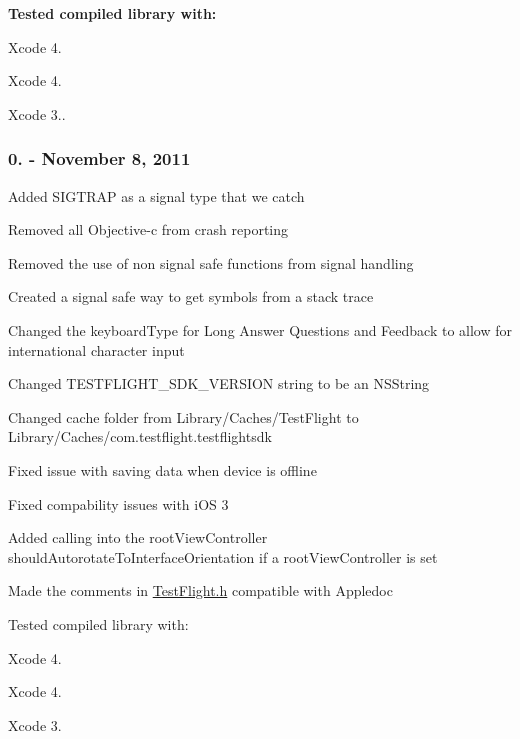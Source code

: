 {\bfseries Tested compiled library with\-:}


\begin{DoxyItemize}
\item Xcode 4.
\item Xcode 4.
\item Xcode 3..
\end{DoxyItemize}

\subsubsection*{0. -\/ November 8, 2011}


\begin{DoxyItemize}
\item Added {\ttfamily S\-I\-G\-T\-R\-A\-P} as a signal type that we catch
\item Removed all Objective-\/c from crash reporting
\item Removed the use of non signal safe functions from signal handling
\item Created a signal safe way to get symbols from a stack trace
\item Changed the keyboard\-Type for Long Answer Questions and Feedback to allow for international character input
\item Changed {\ttfamily T\-E\-S\-T\-F\-L\-I\-G\-H\-T\-\_\-\-S\-D\-K\-\_\-\-V\-E\-R\-S\-I\-O\-N} string to be an {\ttfamily N\-S\-String}
\item Changed cache folder from Library/\-Caches/\-Test\-Flight to Library/\-Caches/com.\-testflight.\-testflightsdk
\item Fixed issue with saving data when device is offline
\item Fixed compability issues with i\-O\-S 3
\item Added calling into the root\-View\-Controller should\-Autorotate\-To\-Interface\-Orientation if a root\-View\-Controller is set
\item Made the comments in \hyperlink{_test_flight_8h}{Test\-Flight.\-h} compatible with Appledoc
\end{DoxyItemize}

Tested compiled library with\-:


\begin{DoxyItemize}
\item Xcode 4.
\item Xcode 4.
\item Xcode 3.
\end{DoxyItemize}

